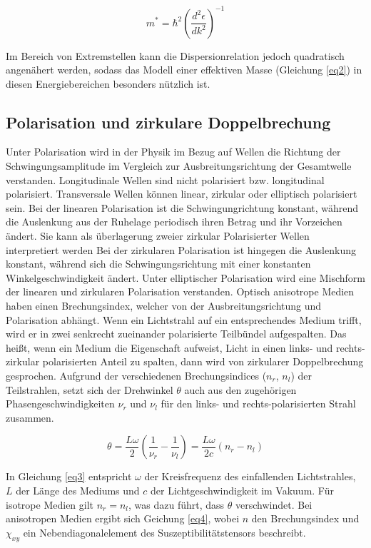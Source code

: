 \begin{equation}
    m^* = \hbar^2 \left( \frac{d^2\epsilon}{dk^2} \right)^{-1}
    \label{eq2}
\end{equation}

Im Bereich von Extremstellen kann die Dispersionrelation jedoch quadratisch angenähert 
werden, sodass das Modell einer effektiven Masse (Gleichung \ref{eq2}) in diesen 
Energiebereichen besonders nützlich ist.

\subsection{Polarisation und zirkulare Doppelbrechung}
Unter Polarisation wird in der Physik im Bezug auf Wellen die Richtung der 
Schwingungsamplitude im Vergleich zur Ausbreitungsrichtung der Gesamtwelle 
verstanden. 
Longitudinale Wellen sind nicht polarisiert bzw. longitudinal polarisiert.
Transversale Wellen können linear, zirkular oder elliptisch polarisiert sein. 
Bei der linearen Polarisation ist die Schwingungrichtung konstant, während die 
Auslenkung aus der Ruhelage periodisch ihren Betrag und ihr Vorzeichen ändert.
Sie kann als überlagerung zweier zirkular Polarisierter Wellen interpretiert werden
Bei der zirkularen Polarisation ist hingegen die Auslenkung konstant, während sich die 
Schwingungsrichtung mit einer konstanten Winkelgeschwindigkeit ändert.
Unter elliptischer Polarisation wird eine Mischform der linearen und zirkularen 
Polarisation verstanden.
Optisch anisotrope Medien haben einen Brechungsindex, welcher von der 
Ausbreitungsrichtung und Polarisation abhängt. 
Wenn ein Lichtstrahl auf ein entsprechendes Medium trifft, wird er in zwei 
senkrecht zueinander polarisierte Teilbündel aufgespalten.
Das heißt, wenn ein Medium die Eigenschaft aufweist, Licht in einen 
links- und rechts-zirkular polarisierten Anteil zu spalten, dann wird von 
zirkularer Doppelbrechung gesprochen.
Aufgrund der verschiedenen Brechungsindices ($n_r$, $n_l$) der Teilstrahlen, setzt sich der 
Drehwinkel $\theta$ auch aus den zugehörigen Phasengeschwindigkeiten $\nu_r$ und $\nu_l$ 
für den links- und rechts-polarisierten Strahl zusammen.

\begin{equation}
    \theta = \frac{L\omega}{2} \left(\frac{1}{\nu_r} - \frac{1}{\nu_l} \right) = \frac{L\omega}{2c} (n_r - n_l )
    \label{eq3}
\end{equation}

In Gleichung \ref{eq3} entspricht $\omega$ der Kreisfrequenz des einfallenden Lichtstrahles, 
$L$ der Länge des Mediums und $c$ der Lichtgeschwindigkeit im Vakuum.
Für isotrope Medien gilt $n_{r} = n_{l}$, was dazu führt, dass $\theta$ verschwindet.
Bei anisotropen Medien ergibt sich Geichung \ref{eq4}, wobei $n$ den Brechungsindex und 
$\chi_{xy}$ ein Nebendiagonalelement des Suszeptibilitätstensors beschreibt.

